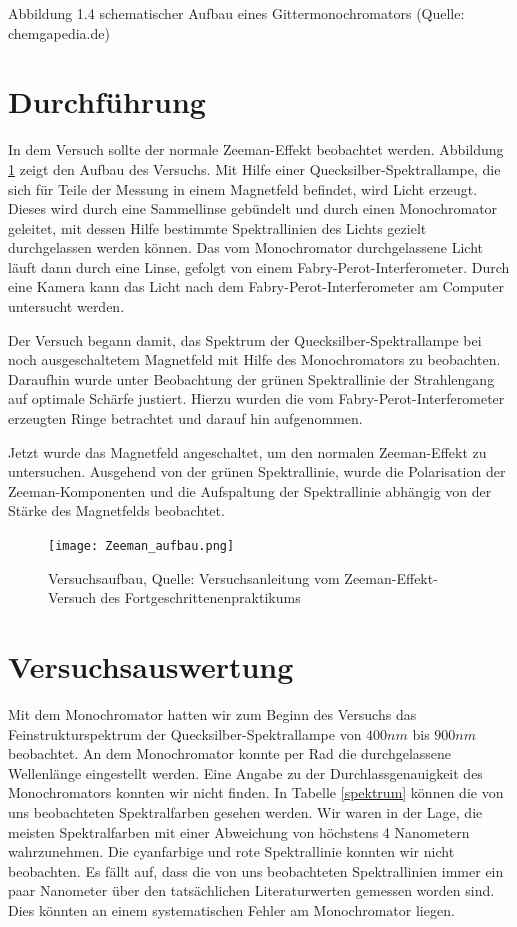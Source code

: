 \documentclass[10pt,a4paper]{article}
\begin{document}
  Abbildung 1.4 schematischer Aufbau eines Gittermonochromators (Quelle: chemgapedia.de)
 
\section{Durchführung}

In dem Versuch sollte der normale Zeeman-Effekt beobachtet werden. Abbildung \ref{aufbau} zeigt den Aufbau des Versuchs. Mit Hilfe einer Quecksilber-Spektrallampe, die sich für Teile der Messung in einem Magnetfeld befindet, wird Licht erzeugt. Dieses wird durch eine Sammellinse gebündelt und durch einen Monochromator geleitet, mit dessen Hilfe bestimmte Spektrallinien des Lichts gezielt durchgelassen werden können. Das vom Monochromator durchgelassene Licht läuft dann durch eine Linse, gefolgt von einem Fabry-Perot-Interferometer. Durch eine Kamera kann das Licht nach dem Fabry-Perot-Interferometer am Computer untersucht werden. 

Der Versuch begann damit, das Spektrum der Quecksilber-Spektrallampe bei noch ausgeschaltetem Magnetfeld mit Hilfe des Monochromators zu beobachten. Daraufhin wurde unter Beobachtung der grünen Spektrallinie der Strahlengang auf optimale Schärfe justiert. Hierzu wurden die vom Fabry-Perot-Interferometer erzeugten Ringe betrachtet und darauf hin aufgenommen.

Jetzt wurde das Magnetfeld angeschaltet, um den normalen Zeeman-Effekt zu untersuchen. Ausgehend von der grünen Spektrallinie, wurde die Polarisation der Zeeman-Komponenten und die Aufspaltung der Spektrallinie abhängig von der Stärke des Magnetfelds beobachtet.

\begin{figure}[h]
	\texttt{[image: Zeeman\_aufbau.png]}
	\centering
	\caption{Versuchsaufbau, Quelle: Versuchsanleitung vom Zeeman-Effekt-Versuch des Fortgeschrittenenpraktikums}
	\label{aufbau}
\end{figure}

\section{Versuchsauswertung}

Mit dem Monochromator hatten wir zum Beginn des Versuchs das Feinstrukturspektrum der Quecksilber-Spektrallampe von $400nm$
bis $900nm$ beobachtet. An dem Monochromator konnte per Rad die durchgelassene Wellenlänge eingestellt werden. Eine Angabe zu der Durchlassgenauigkeit des Monochromators konnten wir nicht finden. In Tabelle \ref{spektrum} können die von uns beobachteten Spektralfarben gesehen werden. Wir waren in der Lage, die meisten Spektralfarben mit einer Abweichung von höchstens 4 Nanometern wahrzunehmen. Die cyanfarbige und rote Spektrallinie konnten wir nicht beobachten. Es fällt auf, dass die von uns beobachteten Spektrallinien immer ein paar Nanometer über den tatsächlichen Literaturwerten gemessen worden sind. Dies könnten an einem systematischen Fehler am Monochromator liegen.
\end{document}
